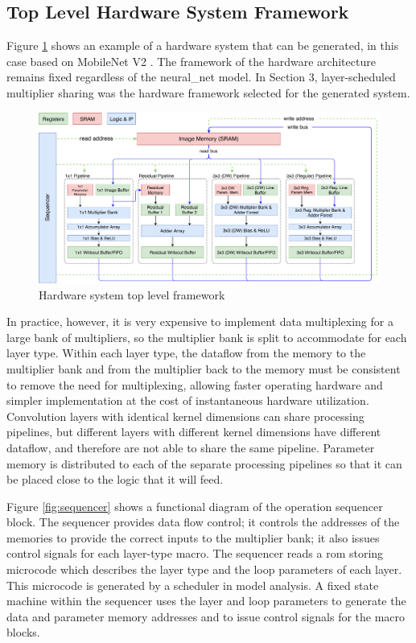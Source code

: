 \documentclass{uw-ece-wkrpt}
\begin{document}
\subsection{Top Level Hardware System Framework}\label{sec:top_level_framework}

Figure \ref{fig:top_level} shows an example of a hardware system that can be generated, in this case based on MobileNet V2 \cite{Howard2017MobileNets:-Eff}. The framework of the hardware architecture remains fixed regardless of the \gls{neural_net} model. In Section 3, layer-scheduled multiplier sharing was the hardware framework selected for the generated system. %

\begin{figure}
\centering
\includegraphics[width=\textwidth]{figures/top_level}
\caption{Hardware system top level framework}\label{fig:top_level}
\end{figure}

In practice, however, it is very expensive to implement data multiplexing for a large bank of multipliers, so the multiplier bank is split to accommodate for each layer type. Within each layer type, the dataflow from the memory to the multiplier bank and from the multiplier back to the memory must be consistent to remove the need for multiplexing, allowing faster operating hardware and simpler implementation at the cost of instantaneous hardware utilization. Convolution layers with identical \gls{kernel} dimensions can share processing pipelines, but different layers with different \gls{kernel} dimensions have different dataflow, and therefore are not able to share the same pipeline. Parameter memory is distributed to each of the separate processing pipelines so that it can be placed close to the logic that it will feed.

Figure \ref{fig:sequencer} shows a functional diagram of the operation sequencer block. The sequencer provides data flow control; it controls the addresses of the memories to provide the correct inputs to the multiplier bank; it also issues control signals for each layer-type macro. The sequencer reads a \gls{rom} storing microcode which describes the layer type and the loop parameters of each layer. This microcode is generated by a scheduler in model analysis. A fixed state machine within the sequencer uses the layer and loop parameters to generate the data and parameter memory addresses and to issue control signals for the macro blocks.
\end{document}

